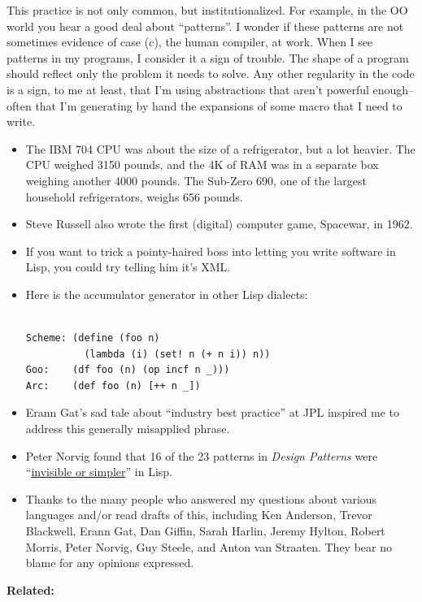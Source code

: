 \documentclass[12pt]{book}
\begin{document}
This practice is not only common, but institutionalized. For example, in
the OO world you hear a good deal about ``patterns''. I wonder if these
patterns are not sometimes evidence of case (c), the human compiler, at
work. When I see patterns in my programs, I consider it a sign of
trouble. The shape of a program should reflect only the problem it needs
to solve. Any other regularity in the code is a sign, to me at least,
that I'm using abstractions that aren't powerful enough-- often that I'm
generating by hand the expansions of some macro that I need to write.


\begin{itemize}
\item
  The IBM 704 CPU was about the size of a refrigerator, but a lot
  heavier. The CPU weighed 3150 pounds, and the 4K of RAM was in a
  separate box weighing another 4000 pounds. The Sub-Zero 690, one of
  the largest household refrigerators, weighs 656 pounds.
\item
  Steve Russell also wrote the first (digital) computer game, Spacewar,
  in 1962.
\item
  If you want to trick a pointy-haired boss into letting you write
  software in Lisp, you could try telling him it's XML.
\item
  Here is the accumulator generator in other Lisp dialects:

\begin{verbatim}

Scheme: (define (foo n) 
          (lambda (i) (set! n (+ n i)) n))
Goo:    (df foo (n) (op incf n _)))
Arc:    (def foo (n) [++ n _])
\end{verbatim}
\item
  Erann Gat's sad tale about ``industry best practice'' at JPL inspired
  me to address this generally misapplied phrase.
\item
  Peter Norvig found that 16 of the 23 patterns in \emph{Design
  Patterns} were
  ``\href{http://www.norvig.com/design-patterns/}{invisible or
  simpler}'' in Lisp.
\item
  Thanks to the many people who answered my questions about various
  languages and/or read drafts of this, including Ken Anderson, Trevor
  Blackwell, Erann Gat, Dan Giffin, Sarah Harlin, Jeremy Hylton, Robert
  Morris, Peter Norvig, Guy Steele, and Anton van Straaten. They bear no
  blame for any opinions expressed.
\end{itemize}

\textbf{Related:}
\end{document}

